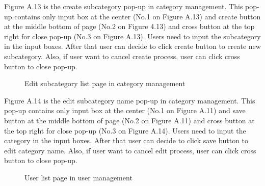 \documentclass[12pt,oneside,openright,a4paper]{cpe-english-project}
\begin{document}
Figure A.13 is the create subcategory pop-up in category management. This pop-up 
contains only input box at the center (No.1 on Figure A.13) and create button at the middle 
bottom of page (No.2 on Figure 4.13) and cross button at the top right for close pop-up (No.3 
on Figure A.13).
Users need to input the subcategory in the input boxes. After that user can decide to 
click create button to create new subcategory. Also, if user want to cancel create process, 
user can click cross button to close pop-up.

\begin{figure}[!h]\centering
{}
\caption{Edit subcategory list page in category management}
\label{fig:Edit subcategory list page in category management}
\end{figure}

Figure A.14 is the edit subcategory name pop-up in category management. This pop-up contains only input box at the center (No.1 on Figure A.11) and save button at the middle 
bottom of page (No.2 on Figure A.11) and cross button at the top right for close pop-up (No.3 
on Figure A.14).
Users need to input the category in the input boxes. After that user can decide to 
click save button to edit category name. Also, if user want to cancel edit process, user can 
click cross button to close pop-up.

\pagebreak
{}
\begin{figure}[!h]\centering
{}
\caption{User list page in user management}
\label{fig:User list page in user management}
\end{figure}
\end{document}
